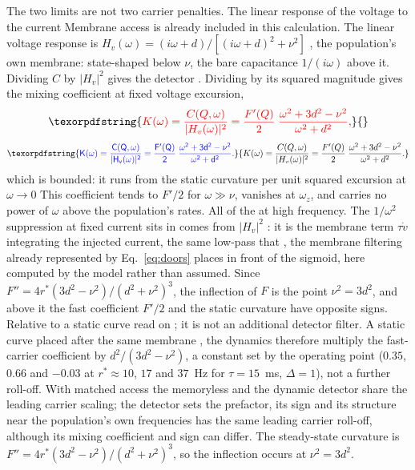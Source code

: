 \documentclass[11pt,a4paper]{article}
\providecommand{\DIFaddtex}[1]{{\protect\color{blue} \sf #1}} %
\providecommand{\DIFdeltex}[1]{{\protect\color{red} \scriptsize #1}} %
\providecommand{\DIFaddbegin}{} %
\providecommand{\DIFaddend}{} %
\providecommand{\DIFdelbegin}{} %
\providecommand{\DIFdelend}{} %
\providecommand{\DIFadd}[1]{\texorpdfstring{\DIFaddtex{#1}}{#1}} %
\providecommand{\DIFdel}[1]{\texorpdfstring{\DIFdeltex{#1}}{}} %
\begin{document}
\DIFdelbegin \DIFdel{The two limits are not two carrier penalties.
The linear response of the voltage to the
current }\DIFdelend \DIFaddbegin \DIFadd{Membrane access is already included in this calculation. The linear voltage response
}\DIFaddend is $H_v(\omega)=(i\omega+d)/[(i\omega+d)^2+\nu^2]$\DIFdelbegin \DIFdel{, the population's own membrane:
state-shaped below $\nu$, the bare capacitance $1/(i\omega)$ above it. Dividing $C$ by $|H_v|^2$ gives the detector }\DIFdelend \DIFaddbegin \DIFadd{. Dividing by its squared magnitude
gives the mixing }\DIFaddend coefficient at fixed voltage excursion,
\DIFdelbegin \begin{displaymath}
\DIFdel{K(\omega)=\frac{C(Q,\omega)}{|H_v(\omega)|^2}
=\frac{F'(Q)}{2}\;\frac{\omega^2+3d^2-\nu^2}{\omega^2+d^2},
}\end{displaymath}%
\DIFdelend \DIFaddbegin \begin{equation}
\DIFadd{K(\omega)=\frac{C(Q,\omega)}{|H_v(\omega)|^2}
=\frac{F'(Q)}{2}\;\frac{\omega^2+3d^2-\nu^2}{\omega^2+d^2}.
\label{eq:kfixed}
}\end{equation}\DIFaddend
\DIFdelbegin \DIFdel{which is bounded: it runs from the static curvature per unit squared excursion at
$\omega\to0$ }\DIFdelend \DIFaddbegin \DIFadd{This coefficient tends }\DIFaddend to $F'/2$ \DIFdelbegin \DIFdel{for $\omega\gg\nu$, vanishes at $\omega_z$, and carries no power of
$\omega$ above the population's rates. All of the }\DIFdelend \DIFaddbegin \DIFadd{at high frequency. The }\DIFaddend $1/\omega^2$ \DIFaddbegin \DIFadd{suppression
}\DIFaddend at fixed current \DIFdelbegin \DIFdel{sits in
}\DIFdelend \DIFaddbegin \DIFadd{comes from }\DIFaddend $|H_v|^2$\DIFdelbegin \DIFdel{: it is the membrane term $\tau\dot v$ integrating the injected current, the same
low-pass that }\DIFdelend \DIFaddbegin \DIFadd{, the membrane filtering already represented
by }\DIFaddend Eq.~\eqref{eq:doors}\DIFdelbegin \DIFdel{places in front of the sigmoid, here computed by the model
rather than assumed. Since $F''=4r^*(3d^2-\nu^2)/(d^2+\nu^2)^3$, the inflection of $F$ is the
point $\nu^2=3d^2$, and above it the fast coefficient $F'/2$ and the static curvature have
opposite signs. Relative to a static curve
read on }\DIFdelend \DIFaddbegin \DIFadd{; it is not an additional detector filter. A static curve
placed after }\DIFaddend the same membrane \DIFdelbegin \DIFdel{, the dynamics therefore
multiply the fast-carrier coefficient by $d^2/(3d^2-\nu^2)$, a constant set by the operating
point ($0.35$, $0.66$ and $-0.03$ at $r^*\approx10$, $17$ and $37$~Hz for $\tau=15$~ms,
$\Delta=1$), not a further roll-off. With matched access the memoryless and the dynamic
detector share the leading carrier scaling; the detector sets the prefactor, its sign and its structure near the population's own frequencies}\DIFdelend \DIFaddbegin \DIFadd{has the same leading carrier roll-off, although
its mixing coefficient and sign can differ. The steady-state curvature is
$F''=4r^*(3d^2-\nu^2)/(d^2+\nu^2)^3$, so the inflection occurs at $\nu^2=3d^2$}\DIFaddend .
\end{document}
